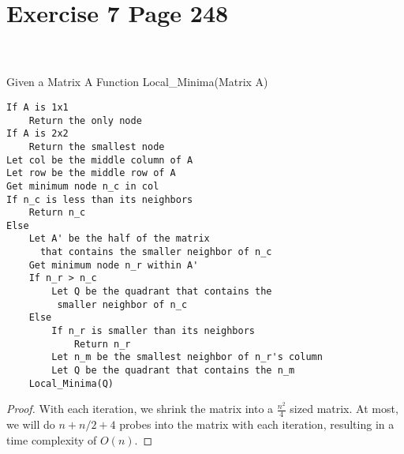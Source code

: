 \documentclass[11pt]{article}
\begin{document}
\section*{Exercise 7 Page 248}
 \\ \\
Given a Matrix A
Function Local\_Minima(Matrix A)
\begin{lstlisting}
If A is 1x1
	Return the only node
If A is 2x2
	Return the smallest node
Let col be the middle column of A
Let row be the middle row of A
Get minimum node n_c in col
If n_c is less than its neighbors
	Return n_c
Else
	Let A' be the half of the matrix 
	  that contains the smaller neighbor of n_c
	Get minimum node n_r within A'
	If n_r > n_c
		Let Q be the quadrant that contains the 
		 smaller neighbor of n_c
	Else
		If n_r is smaller than its neighbors
			Return n_r
		Let n_m be the smallest neighbor of n_r's column
		Let Q be the quadrant that contains the n_m
	Local_Minima(Q)
\end{lstlisting}
\begin{proof}
With each iteration, we shrink the matrix into a $\frac{n^2}{4}$ sized matrix. At most, we will do $n+n/2 +4$ probes into the matrix with each iteration, resulting in a time complexity of $O(n)$.
\end{proof}
\newpage
\end{document}
